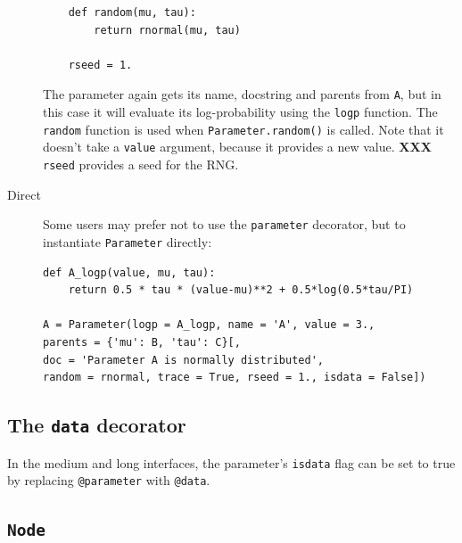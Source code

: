 \documentclass[]{book}
\begin{document}
\begin{description}
\begin{verbatim}
    def random(mu, tau):
        return rnormal(mu, tau)

    rseed = 1.
    \end{verbatim}
The parameter again gets its name, docstring and parents from \texttt{A}, but in this case it will evaluate its log-probability using the \texttt{logp} function. The \texttt{random} function is used when \texttt{Parameter.random()} is called. Note that it doesn't take a \texttt{value} argument, because it provides a new value. \textbf{XXX} \texttt{rseed} provides a seed for the RNG.

    \item[Direct] Some users may prefer not to use the \texttt{parameter} decorator, but to instantiate \texttt{Parameter} directly:
\begin{verbatim}
def A_logp(value, mu, tau):
    return 0.5 * tau * (value-mu)**2 + 0.5*log(0.5*tau/PI)

A = Parameter(logp = A_logp, name = 'A', value = 3.,
parents = {'mu': B, 'tau': C}[,
doc = 'Parameter A is normally distributed',
random = rnormal, trace = True, rseed = 1., isdata = False])
\end{verbatim}
\end{description}



\subsection{The \texttt{data} decorator}\label{sub:@data}
In the medium and long interfaces, the parameter's \texttt{isdata} flag can be set to true by replacing \texttt{@parameter} with \texttt{@data}.


\subsection{\texttt{Node}}\label{sub:node}
\end{document}
